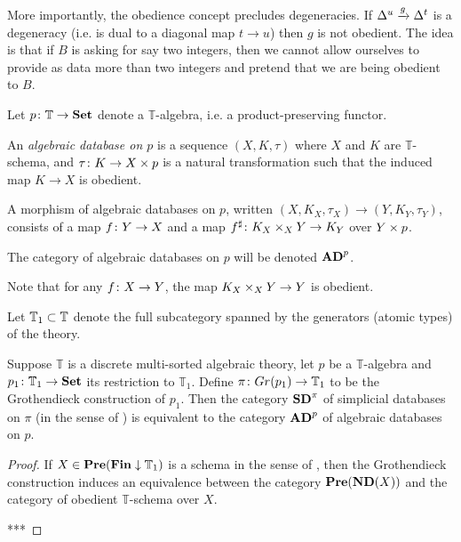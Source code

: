 \documentclass{amsart}
\def\TT{\mathbb T}
\def\Set{{\bf Set}}
\def\AD{{\bf AD}}
\def\SD{{\bf SD}}
\def\Pre{{\bf Pre}}
\def\Fin{{\bf Fin}}
\def\ND{{\bf ND}}
\begin{document}
\begin{example}

More importantly, the obedience concept precludes degeneracies.  If $\Delta^u\xrightarrow{g}\Delta^t$ is a degeneracy (i.e. is dual to a diagonal map $t\to u$) then $g$ is not obedient.  The idea is that if $B$ is asking for say two integers, then we cannot allow ourselves to provide as data more than two integers and pretend that we are being obedient to $B$.

\end{example}

Let $p\taking\TT\to\Set$ denote a $\TT$-algebra, i.e. a product-preserving functor.  

\begin{definition}

An  {\em algebraic database on $p$} is a sequence $(X,K,\tau)$ where $X$ and $K$ are  $\TT$-schema, and $\tau\colon K\rightarrow X\times p$ is a natural transformation such that the induced map $K\to X$ is obedient.

A morphism of algebraic databases on $p$, written $(X,K_X,\tau_X)\to(Y,K_Y,\tau_Y)$, consists of a map $f\colon Y\rightarrow X$ and a map $f^\sharp\colon K_X\times_XY\rightarrow K_Y$ over $Y\times p$.

The category of algebraic databases on $p$ will be denoted $\AD^p$.

\end{definition}

Note that for any $f\colon X\rightarrow Y$, the map $K_X\times_XY\rightarrow Y$ is obedient.

Let $\TT_1\ss\TT$ denote the full subcategory spanned by the generators (atomic types) of the theory.

\begin{proposition}

Suppose $\TT$ is a discrete multi-sorted algebraic theory, let $p$ be a $\TT$-algebra and $p_1\taking\TT_1\to\Set$ its restriction to $\TT_1$.  Define $\pi\taking Gr(p_1)\to\TT_1$ to be the Grothendieck construction of $p_1$.  Then the category $\SD^\pi$ of simplicial databases on $\pi$ (in the sense of \cite{SD}) is equivalent to the category $\AD^p$ of algebraic databases on $p$.

\end{proposition}

\begin{proof}

If $X\in\Pre(\Fin\down\TT_1)$ is a schema in the sense of \cite{SD}, then the Grothendieck construction induces an equivalence between the category $\Pre(\ND(X))$ and the category of obedient $\TT$-schema over $X$.

***

\end{proof}
\end{document}

